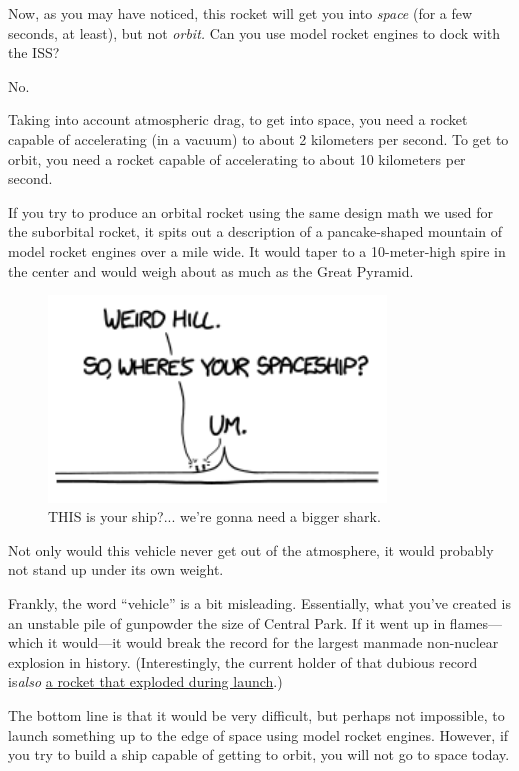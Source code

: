 {Now, as you may have noticed, this rocket will get you into \emph{space} (for a few seconds, at least), but not \emph{orbit.} Can you use model rocket engines to dock with the ISS?}

{No.}

{Taking into account atmospheric drag, to get into space, you need a rocket capable of accelerating (in a vacuum) to about 2 kilometers per second. To get to orbit, you need a rocket capable of accelerating to about 10 kilometers per second.}

{If you try to produce an orbital rocket using the same design math we used for the suborbital rocket, it spits out a description of a pancake-shaped mountain of model rocket engines over a mile wide. It would taper to a 10-meter-high spire in the center and would weigh about as much as the Great Pyramid.}

\begin{figure}[!htbp]
\centering
\includegraphics[scale=0.5, max width=0.8\textwidth]{imgs/a/24/model_pyramid.png}
\caption{THIS is your ship?... we're gonna need a bigger shark.}
\end{figure}

{Not only would this vehicle never get out of the atmosphere, it would probably not stand up under its own weight.}

{Frankly, the word “vehicle” is a bit misleading. Essentially, what you’ve created is an unstable pile of gunpowder the size of Central Park. If it went up in flames—which it would—it would break the record for the largest manmade non-nuclear explosion in history. (Interestingly, the current holder of that dubious record is\emph{also} \href{http://www.youtube.com/watch?v=m79UO4HOQmc}{a rocket that exploded during launch}.)}

{The bottom line is that it would be very difficult, but perhaps not impossible, to launch something up to the edge of space using model rocket engines. However, if you try to build a ship capable of getting to orbit, you will not go to space today.}

